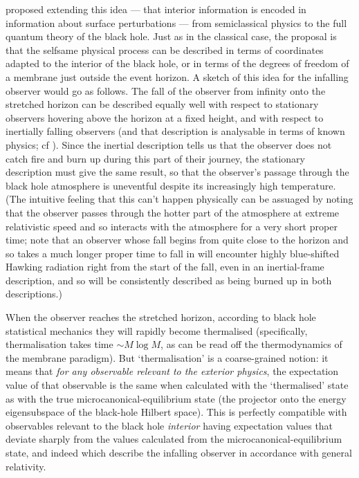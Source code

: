 \documentclass{article}
\begin{document}
 proposed extending this idea --- that interior information is encoded in information about surface perturbations --- from semiclassical physics to the full quantum theory of the black hole. Just as in the classical case, the proposal is that the selfsame physical process can be described in terms of coordinates adapted to the interior of the black hole, or in terms of the degrees of freedom of a membrane just outside the event horizon. A sketch of this idea for the infalling observer would go as follows. The fall of the observer from infinity onto the stretched horizon can be described equally well with respect to stationary observers hovering above the horizon at a fixed height, and with respect to inertially falling observers (and that description is analysable in terms of known physics; cf ). Since the inertial description tells us that the observer does not catch fire and burn up during this part of their journey, the stationary description must give the same result, so that the observer's passage through the black hole atmosphere is uneventful despite its increasingly high temperature. (The intuitive feeling that this can't happen physically can be assuaged by noting that the observer passes through the hotter part of the atmosphere at extreme relativistic speed and so interacts with the atmosphere for a very short proper time; note that an observer whose fall begins from quite close to the horizon and so takes a much longer proper time to fall in will encounter highly blue-shifted Hawking radiation right from the start of the fall, even in an inertial-frame description, and so will be consistently described as being burned up in both descriptions.)

When the observer reaches the stretched horizon, according to black hole statistical mechanics they will rapidly become thermalised (specifically, thermalisation takes time $\sim M \log M$, as can be read off the thermodynamics of the membrane paradigm). But `thermalisation' is a coarse-grained notion: it means that \emph{for any observable relevant to the exterior physics}, the expectation value of that observable is the same  when calculated with the `thermalised' state as with the true microcanonical-equilibrium state (the projector onto the energy eigensubspace of the black-hole Hilbert space). This is perfectly compatible with observables relevant to the black hole \emph{interior} having expectation values that deviate sharply from the values calculated from the microcanonical-equilibrium state, and indeed which describe the infalling observer in accordance with general relativity.
\end{document}
